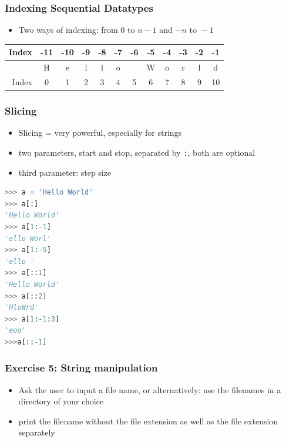 \documentclass[english]{beamer}
\begin{document}
\begin{frame}
\frametitle{Indexing Sequential Datatypes}

\begin{itemize}
	\item Two ways of indexing: from \(0 \text{ to } n-1\) and \(-n \text{ to } -1\)
\end{itemize}

\begin{center}
\begin{tabular}{r|c|c|c|c|c|c|c|c|c|c|c|}
Index & -11 & -10 & -9 & -8 & -7 & -6 & -5 & -4 & -3 & -2 & -1 \\ \toprule
&H&e&l&l&o& &W&o&r&l&d \\ \toprule
Index & 0 & 1 & 2 & 3 & 4 & 5 & 6 & 7 & 8 & 9 & 10 \\ \toprule
\end{tabular}
\end{center}

\end{frame}

\begin{frame}[containsverbatim]
\frametitle{Slicing}

\begin{itemize}
\item Slicing = very powerful, especially for strings
\item two parameters, start and stop, separated by \texttt{:}, both are optional
\item third parameter: step size
\end{itemize}\vspace*{0em}

\begin{lstlisting}[language={Python}]
>>> a = 'Hello World'
>>> a[:]
'Hello World'
>>> a[1:-1]
'ello Worl'
>>> a[1:-5]
'ello '
>>> a[::1]
'Hello World'
>>> a[::2]
'HloWrd'
>>> a[1:-1:3]
'eoo'
>>>a[::-1]
\end{lstlisting}

\end{frame}

\begin{frame}
\frametitle{Exercise 5: String manipulation}

\begin{itemize}
\item Ask the user to input a file name, or alternatively: use the filenames in a directory of your choice
\item print the filename without the file extension as well as the file extension separately
\end{itemize}
\end{frame}
\end{document}

